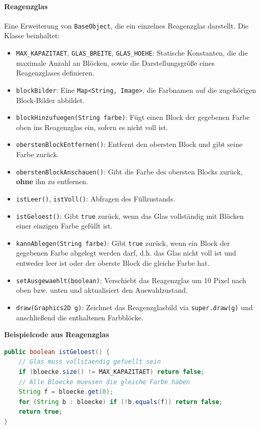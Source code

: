 \paragraph{Reagenzglas}
Eine Erweiterung von \texttt{BaseObject}, die ein einzelnes Reagenzglas darstellt.
Die Klasse beinhaltet:

\begin{sloppypar}
    \begin{itemize}
        \item \texttt{MAX\_KAPAZITAET}, \texttt{GLAS\_BREITE}, \texttt{GLAS\_HOEHE}: Statische Konstanten, die die maximale Anzahl an Blöcken, sowie die Darstellungsgröße eines Reagenzglases definieren.
        \item \texttt{blockBilder}: Eine \texttt{Map<String, Image>}, die Farbnamen auf die zugehörigen Block-Bilder abbildet.
        \item \texttt{blockHinzufuegen(String farbe)}: Fügt einen Block der gegebenen Farbe oben ins Reagenzglas ein, sofern es nicht voll ist.
        \item \texttt{oberstenBlockEntfernen()}: Entfernt den obersten Block und gibt seine Farbe zurück.
        \item \texttt{oberstenBlockAnschauen()}: Gibt die Farbe des obersten Blocks zurück, \textbf{ohne} ihn zu entfernen.
        \item \texttt{istLeer()}, \texttt{istVoll()}: Abfragen des Füllzustands.
        \item \texttt{istGeloest()}: Gibt \texttt{true} zurück, wenn das Glas vollständig mit Blöcken einer einzigen Farbe gefüllt ist.
        \item \texttt{kannAblegen(String farbe)}: Gibt \texttt{true} zurück, wenn ein Block der gegebenen Farbe abgelegt werden darf, d.h. das Glas nicht voll ist und entweder leer ist oder der oberste Block die gleiche Farbe hat.
        \item \texttt{setAusgewaehlt(boolean)}: Verschiebt das Reagenzglas um 10 Pixel nach oben bzw. unten und aktualisiert den Auswahlzustand.
        \item \texttt{draw(Graphics2D g)}: Zeichnet das Reagenzglasbild via \texttt{super.draw(g)} und anschließend die enthaltenen Farbblöcke.
    \end{itemize}
\end{sloppypar}

\textbf{Beispielcode aus Reagenzglas}
\begin{lstlisting}[caption=istGeloest-Methode, label=lst:mgistgeloest, captionpos=t, language=Java]
public boolean istGeloest() {
    // Glas muss vollstaendig gefuellt sein
    if (bloecke.size() != MAX_KAPAZITAET) return false;
    // Alle Bloecke muessen die gleiche Farbe haben
    String f = bloecke.get(0);
    for (String b : bloecke) if (!b.equals(f)) return false;
    return true;
}
\end{lstlisting}

